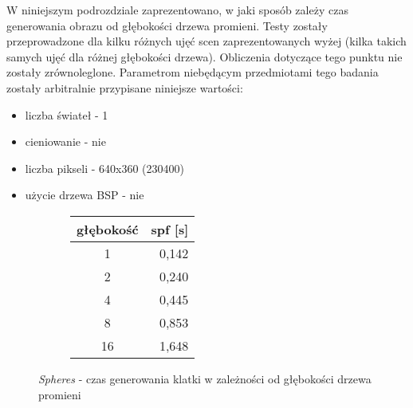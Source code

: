W niniejszym podrozdziale zaprezentowano, w jaki sposób zależy czas generowania obrazu od głębokości drzewa promieni. Testy zostały przeprowadzone dla kilku różnych ujęć scen zaprezentowanych wyżej (kilka takich samych ujęć dla różnej głębokości drzewa). Obliczenia dotyczące tego punktu nie zostały zrównoleglone. Parametrom niebędącym przedmiotami tego badania zostały arbitralnie przypisane niniejsze wartości:

\begin{itemize}
\item liczba świateł - 1
\item cieniowanie - nie
\item liczba pikseli - 640x360 (230400)
\item użycie drzewa BSP - nie
\end{itemize}
%
\begin{figure}[H]
\begin{subfigure}{.5\textwidth}
\end{subfigure}
\begin{subfigure}{.5\textwidth}
		\caption{Tabla z wynikami}
		\begin{longtable}{|c|r|} \hline
	    głębokość & \multicolumn{1}{|c|}{spf [s]} \\ \hline
	    1 & 0,142 \\
		2 & 0,240 \\
		4 & 0,445 \\
		8 & 0,853 \\
		16 & 1,648 \\
		\hline
		\end{longtable}
\end{subfigure}
\vspace*{-2mm}
\caption{\emph{Spheres} - czas generowania klatki w zależności od głębokości drzewa promieni}
\end{figure}
